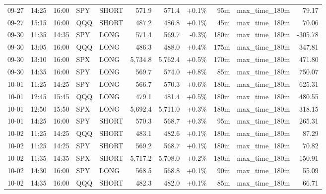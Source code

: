 \documentclass[11pt,a4paper,twoside]{article}
\begin{document}
\begin{center}
\begin{longtable}{>{\color{txtmain}}l l l l l r r r r >{\color{txtmain}}l r}
09-27 & 14:25 & 16:00 & SPY & SHORT & 571.9 & 571.4 & \textcolor{wingreen}{+0.1\%} & 95m & max\_time\_180m & \textcolor{wingreen}{79.17} \\
09-27 & 15:15 & 16:00 & QQQ & SHORT & 487.2 & 486.8 & \textcolor{wingreen}{+0.1\%} & 45m & max\_time\_180m & \textcolor{wingreen}{70.06} \\
09-30 & 11:35 & 14:35 & SPY & LONG & 571.4 & 569.7 & \textcolor{lossred}{-0.3\%} & 180m & max\_time\_180m & \textcolor{lossred}{-305.78} \\
09-30 & 13:05 & 16:00 & QQQ & LONG & 486.3 & 488.0 & \textcolor{wingreen}{+0.4\%} & 175m & max\_time\_180m & \textcolor{wingreen}{347.81} \\
09-30 & 13:10 & 16:00 & SPX & LONG & 5,734.8 & 5,762.4 & \textcolor{wingreen}{+0.5\%} & 170m & max\_time\_180m & \textcolor{wingreen}{471.80} \\
09-30 & 14:35 & 16:00 & SPY & LONG & 569.7 & 574.0 & \textcolor{wingreen}{+0.8\%} & 85m & max\_time\_180m & \textcolor{wingreen}{750.07} \\
10-01 & 11:25 & 14:25 & SPY & LONG & 566.7 & 570.3 & \textcolor{wingreen}{+0.6\%} & 180m & max\_time\_180m & \textcolor{wingreen}{625.31} \\
10-01 & 12:45 & 15:45 & QQQ & LONG & 479.1 & 481.4 & \textcolor{wingreen}{+0.5\%} & 180m & max\_time\_180m & \textcolor{wingreen}{480.55} \\
10-01 & 12:50 & 15:50 & SPX & LONG & 5,692.4 & 5,711.0 & \textcolor{wingreen}{+0.3\%} & 180m & max\_time\_180m & \textcolor{wingreen}{318.15} \\
10-01 & 14:25 & 16:00 & SPY & SHORT & 570.3 & 568.7 & \textcolor{wingreen}{+0.3\%} & 95m & max\_time\_180m & \textcolor{wingreen}{265.31} \\
10-02 & 11:25 & 14:25 & QQQ & SHORT & 483.1 & 482.6 & \textcolor{wingreen}{+0.1\%} & 180m & max\_time\_180m & \textcolor{wingreen}{87.29} \\
10-02 & 11:25 & 14:25 & SPY & SHORT & 569.2 & 568.7 & \textcolor{wingreen}{+0.1\%} & 180m & max\_time\_180m & \textcolor{wingreen}{70.82} \\
10-02 & 11:35 & 14:35 & SPX & SHORT & 5,717.2 & 5,708.0 & \textcolor{wingreen}{+0.2\%} & 180m & max\_time\_180m & \textcolor{wingreen}{150.91} \\
10-02 & 14:30 & 16:00 & SPY & LONG & 568.5 & 568.8 & \textcolor{wingreen}{+0.1\%} & 90m & max\_time\_180m & \textcolor{wingreen}{55.09} \\
10-02 & 14:35 & 16:00 & QQQ & SHORT & 482.3 & 482.0 & \textcolor{wingreen}{+0.1\%} & 85m & max\_time\_180m & \textcolor{wingreen}{66.71} \\

\end{longtable}
\end{center}
\end{document}
